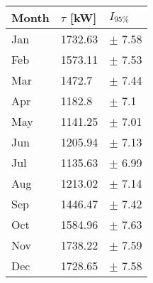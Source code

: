 \begin{tabular}{lll}
\toprule
Month & $\tau$ [kW] &   $I_{95\%}$ \\
\midrule
  Jan &     1732.63 &   $\pm$ 7.58 \\
  Feb &     1573.11 &   $\pm$ 7.53 \\
  Mar &      1472.7 &   $\pm$ 7.44 \\
  Apr &      1182.8 &    $\pm$ 7.1 \\
  May &     1141.25 &   $\pm$ 7.01 \\
  Jun &     1205.94 &   $\pm$ 7.13 \\
  Jul &     1135.63 &   $\pm$ 6.99 \\
  Aug &     1213.02 &   $\pm$ 7.14 \\
  Sep &     1446.47 &   $\pm$ 7.42 \\
  Oct &     1584.96 &   $\pm$ 7.63 \\
  Nov &     1738.22 &   $\pm$ 7.59 \\
  Dec &     1728.65 &   $\pm$ 7.58 \\
\bottomrule
\end{tabular}
